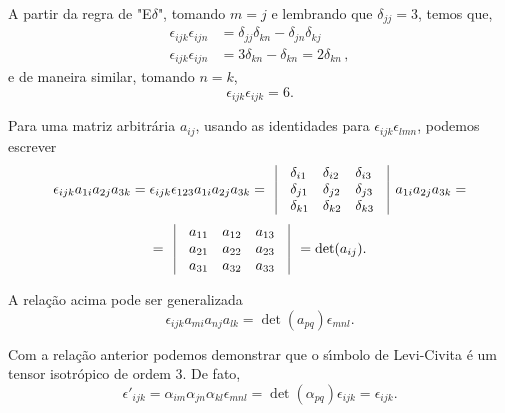 A partir da regra de "E$\delta$", tomando $m=j$ e lembrando que $\delta_{jj}=3$, temos que,
\begin{align}
  \epsilon_{ijk}\epsilon_{ijn}&=\delta_{jj}\delta_{kn}-\delta_{jn}\delta_{kj}\\
  \epsilon_{ijk}\epsilon_{ijn}&=3\delta_{kn}-\delta_{kn} = 2\delta_{kn} \, ,
\end{align}
e de maneira similar, tomando $n=k$,
\begin{equation}
\epsilon_{ijk}\epsilon_{ijk}=6.
\end{equation}


Para uma matriz arbitr\'aria $a_{ij}$, usando as identidades  para
$\epsilon_{ijk}\epsilon_{lmn}$, podemos escrever
\begin{equation}
\epsilon_{ijk}a_{1i}a_{2j}a_{3k}=\epsilon_{ijk}\epsilon_{123}a_{1i}a_{2j}a_{3k}=
\begin{array}{lllll}
                \vline&\delta_{i1} & \delta_{i2} & \delta_{i3}&\vline \\
                \vline&\delta_{j1} & \delta_{j2} & \delta_{j3}&\vline \\
                \vline&\delta_{k1} & \delta_{k2} & \delta_{k3}& \vline\\
\end{array}a_{1i}a_{2j}a_{3k}=
\end{equation}
 \begin{equation}
 =\begin{array}{lllll}
                \vline&a_{11} & a_{12} & a_{13}& \vline\\
                \vline&a_{21} & a_{22} & a_{23}&\vline \\
                \vline&a_{31} & a_{32} & a_{33}&\vline \\
\end{array}=\det(a_{ij}).
\end{equation}

A rela\c{c}\~ao acima pode ser generalizada
\begin{equation}
\epsilon_{ijk}a_{mi}a_{nj}a_{lk}=\det(a_{pq})\epsilon_{mnl}.
\end{equation}

Com a rela\c{c}\~ao anterior podemos demonstrar que  o s\'\i mbolo
de Levi-Civita \'e um tensor isotr\'opico de ordem $3$. De fato,
\begin{equation}
\epsilon'_{ijk}=\alpha_{im}\alpha_{jn}\alpha_{kl}\epsilon_{mnl}=\det(\alpha_{pq})\epsilon_{ijk}=\epsilon_{ijk}.
\end{equation}

